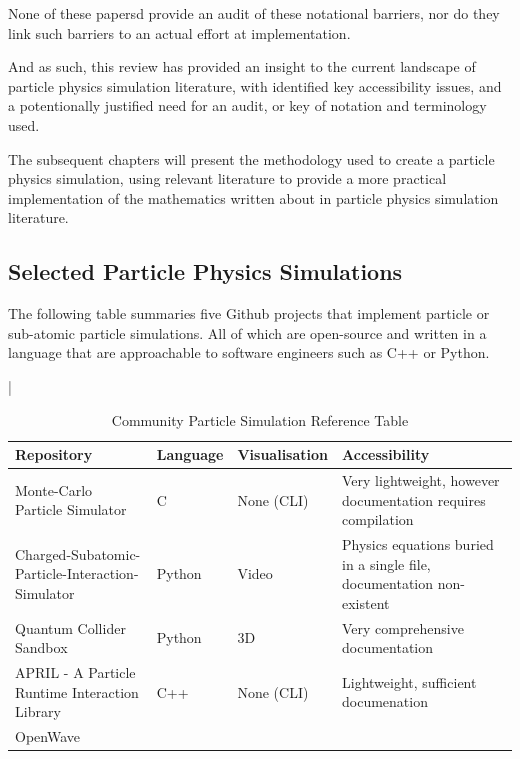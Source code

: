 None of these papersd provide an audit of these notational barriers, nor do they link such barriers to an actual effort at implementation.

And as such, this review has provided an insight to the current landscape of particle physics simulation literature, with identified key accessibility issues, and a potentionally justified need for
an audit, or key of notation and terminology used.

The subsequent chapters will present the methodology used to create a particle physics simulation, using relevant literature to provide a more practical implementation of the mathematics written about
in particle physics simulation literature.

\subsection{Selected Particle Physics Simulations}

The following table summaries five Github projects that implement particle or sub-atomic particle simulations.
All of which are open-source and written in a language that are approachable to software engineers such as C++ or Python.

|

\begin{table}[ht]
    \centering
    \caption{Community Particle Simulation Reference Table}
    \label{tab:community-sims}
    \begin{tabularx}{\textwidth}{@{} L l l L @{}}
        \toprule
        Repository & Language & Visualisation & Accessibility \\
        \midrule
        Monte-Carlo Particle Simulator & C & None (CLI) & Very lightweight, however documentation requires compilation \\
        \addlinespace
        Charged-Subatomic-Particle-Interaction-Simulator & Python & Video & Physics equations buried in a single file, documentation non-existent \\
        \addlinespace
        Quantum Collider Sandbox & Python & 3D & Very comprehensive documentation \\
        \addlinespace
        APRIL \-- A Particle Runtime Interaction Library & C++ & None (CLI) & Lightweight, sufficient documenation \\
        \addlinespace
        OpenWave &  &  &  \\
        \bottomrule
    \end{tabularx}
\end{table}

